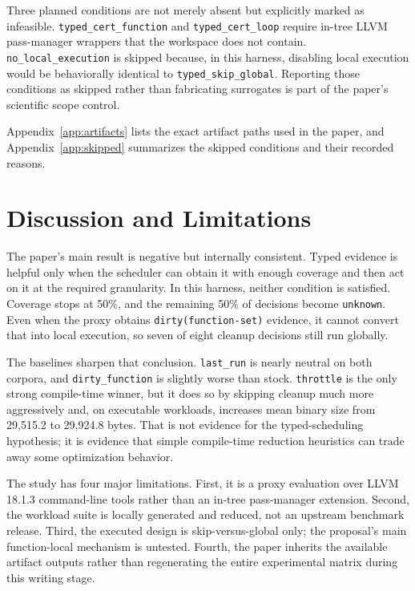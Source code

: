 \documentclass{article}
\begin{document}
Three planned conditions are not merely absent but explicitly marked as infeasible. \texttt{typed\_cert\_function} and \texttt{typed\_cert\_loop} require in-tree LLVM pass-manager wrappers that the workspace does not contain. \texttt{no\_local\_execution} is skipped because, in this harness, disabling local execution would be behaviorally identical to \texttt{typed\_skip\_global}. Reporting those conditions as skipped rather than fabricating surrogates is part of the paper's scientific scope control.

Appendix~\ref{app:artifacts} lists the exact artifact paths used in the paper, and Appendix~\ref{app:skipped} summarizes the skipped conditions and their recorded reasons.

\section{Discussion and Limitations}
\label{sec:discussion}

The paper's main result is negative but internally consistent. Typed evidence is helpful only when the scheduler can obtain it with enough coverage and then act on it at the required granularity. In this harness, neither condition is satisfied. Coverage stops at 50\%, and the remaining 50\% of decisions become \texttt{unknown}. Even when the proxy obtains \texttt{dirty(function-set)} evidence, it cannot convert that into local execution, so seven of eight cleanup decisions still run globally.

The baselines sharpen that conclusion. \texttt{last\_run} is nearly neutral on both corpora, and \texttt{dirty\_function} is slightly worse than stock. \texttt{throttle} is the only strong compile-time winner, but it does so by skipping cleanup much more aggressively and, on executable workloads, increases mean binary size from 29{,}515.2 to 29{,}924.8 bytes. That is not evidence for the typed-scheduling hypothesis; it is evidence that simple compile-time reduction heuristics can trade away some optimization behavior.

The study has four major limitations. First, it is a proxy evaluation over LLVM 18.1.3 command-line tools rather than an in-tree pass-manager extension. Second, the workload suite is locally generated and reduced, not an upstream benchmark release. Third, the executed design is skip-versus-global only; the proposal's main function-local mechanism is untested. Fourth, the paper inherits the available artifact outputs rather than regenerating the entire experimental matrix during this writing stage.
\end{document}
